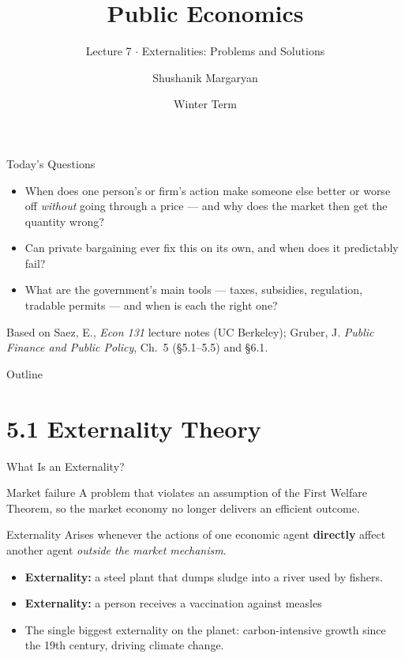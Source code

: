 \documentclass[11pt,aspectratio=169]{beamer}
\title{Public Economics}
\subtitle{Lecture 7 \(\cdot\) Externalities: Problems and Solutions}
\author{Shushanik Margaryan}
\institute{WU Vienna University of Economics and Business}
\date{Winter Term}
\begin{document}
\begin{frame}
  \titlepage
\end{frame}

\begin{frame}{Today's Questions}
  \begin{itemize}
    \item When does one person's or firm's action make someone else better or worse off \emph{without} going through a price --- and why does the market then get the quantity wrong?
    \item Can private bargaining ever fix this on its own, and when does it predictably fail?
    \item What are the government's main tools --- taxes, subsidies, regulation, tradable permits --- and when is each the right one?
  \end{itemize}
  \vspace{1em}
  \begin{block}{Based on}
    Saez, E., \emph{Econ 131} lecture notes (UC Berkeley); Gruber, J. \emph{Public Finance and Public Policy}, Ch.\ 5 (\S5.1--5.5) and \S6.1.
  \end{block}
\end{frame}

\begin{frame}{Outline}
  \tableofcontents
\end{frame}

\section{5.1 Externality Theory}

\begin{frame}{What Is an Externality?}
  \begin{block}{Market failure}
    A problem that violates an assumption of the First Welfare Theorem, so the market economy no longer delivers an efficient outcome.
  \end{block}
  \begin{block}{Externality}
    Arises whenever the actions of one economic agent \textbf{directly} affect another agent \emph{outside the market mechanism}.
  \end{block}
  \begin{itemize}
    \item \textbf{Externality:} a steel plant that dumps sludge into a river used by fishers.
    \item \textbf{Externality:} a person receives a vaccination against measles
    \item The single biggest externality on the planet: carbon-intensive growth since the 19th century, driving climate change.
  \end{itemize}
\end{frame}
\end{document}

